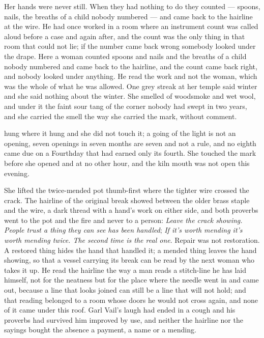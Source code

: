 Her hands were never still. When they had nothing to do they counted --- spoons, nails, the breaths of a child nobody numbered --- and came back to the hairline at the wire. He had once worked in a room where an instrument count was called aloud before a case and again after, and the count was the only thing in that room that could not lie; if the number came back wrong somebody looked under the drape. Here a woman counted spoons and nails and the breaths of a child nobody numbered and came back to the hairline, and the count came back right, and nobody looked under anything. He read the work and not the woman, which was the whole of what he was allowed. One grey streak at her temple said winter and she said nothing about the winter. She smelled of woodsmoke and wet wool, and under it the faint sour tang of the corner nobody had swept in two years, and she carried the smell the way she carried the mark, without comment.

 hung where it hung and she did not touch it; a going of the light is not an opening, seven openings in seven months are seven and not a rule, and no eighth came due on a Fourthday that had earned only its fourth. She touched the mark before she opened  and at no other hour, and the kiln mouth was not open this evening.

She lifted the twice-mended pot thumb-first where the tighter wire crossed the crack. The hairline of the original break showed between the older brass staple and the wire, a dark thread with a hand's work on either side, and both proverbs went to the pot and the fire and never to a person: \emph{Leave the crack showing. People trust a thing they can see has been handled}; \emph{If it's worth mending it's worth mending twice. The second time is the real one}. Repair was not restoration. A restored thing hides the hand that handled it; a mended thing leaves the hand showing, so that a vessel carrying its break can be read by the next woman who takes it up. He read the hairline the way a man reads a stitch-line he has laid himself, not for the neatness but for the place where the needle went in and came out, because a line that looks joined can still be a line that will not hold; and that reading belonged to a room whose doors he would not cross again, and none of it came under this roof. Garl Vail's laugh had ended in a cough and his proverbs had survived him improved by use, and neither the hairline nor the sayings bought the absence a payment, a name or a mending.

